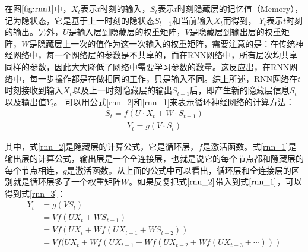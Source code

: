 在图$\ref{fig:rnn1}$中，$X_{t}$表示$t$时刻的输入，$S_{t}$表示$t$时刻隐藏层的记忆值（Memory），记为隐状态，它是基于上一时刻的隐状态$S_{t-1}$和当前输入$X_{t}$而得到，
$Y_{t}$表示$t$时刻的输出。另外，$U$是输入层到隐藏层的权重矩阵，$V$是隐藏层到输出层的权重矩阵，$W$是隐藏层上一次的值作为这一次输入的权重矩阵，需要注意的是：在传统神经网络中，每一个网络层的参数是不共享的，而在RNN网络中，所有层次均共享同样的参数，因此大大降低了网络中需要学习参数的数量。这反应出，在RNN网络中，每一步操作都是在做相同的工作，只是输入不同。综上所述，RNN网络在$t$时刻接收到输入$X_{t}$以及上一时刻隐藏层的输出$S_{t-1}$后，即产生新的隐藏层信息$S_{t}$以及输出值$Y_{t}$。
可以用公式\eqref{rnn_2}和\eqref{rnn_1}来表示循环神经网络的计算方法：
\begin{equation}
\label{rnn_2}
\begin{aligned}
S_{t}=f(U \cdot X_{t}+W \cdot S_{t-1})
\end{aligned}
\end{equation}
\begin{equation}
\label{rnn_1}
\begin{aligned}
Y_{t}=g(V \cdot  S_{t})
\end{aligned}
\end{equation}

其中，式\eqref{rnn_2}是隐藏层的计算公式，它是循环层，$f$是激活函数。式\eqref{rnn_1}是输出层的计算公式，输出层是一个全连接层，也就是说它的每个节点都和隐藏层的每个节点相连，$g$是激活函数。从上面的公式中可以看出，循环层和全连接层的区别就是循环层多了一个权重矩阵$W$。如果反复把式$\eqref{rnn_2}$带入到式$\eqref{rnn_1}$，可以得到式\eqref{rnn_3}：
\begin{equation}
\label{rnn_3}
\begin{aligned}
Y_{t}&=g(V S_{t})\\
&=V f(U X_{t}+W S_{t-1})\\
&=V f(U X_{t}+W f(U X_{t-1}+W S_{t-2}))\\
&=V f(U X_{t}+W f(U X_{t-1}+W f(U X_{t-2}+W f(U X_{t-3}+\cdots)))\\
\end{aligned}
\end{equation}

